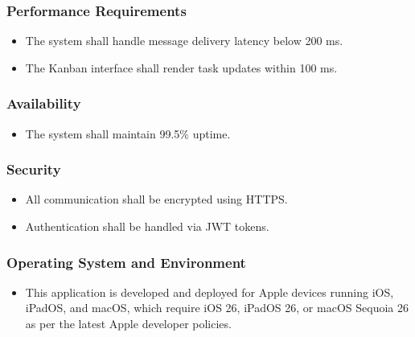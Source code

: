 \documentclass[11pt]{article}
\begin{document}
\subsubsection{Performance Requirements}
\begin{itemize}
  \item The system shall handle message delivery latency below 200 ms.
  \item The Kanban interface shall render task updates within 100 ms.
\end{itemize}

\subsubsection{Availability}
\begin{itemize}
  \item The system shall maintain 99.5\% uptime.
\end{itemize}

\subsubsection{Security}
\begin{itemize}
  \item All communication shall be encrypted using HTTPS.
  \item Authentication shall be handled via JWT tokens.
\end{itemize}

\subsubsection{Operating System and Environment}
\begin{itemize}
  \item This application is developed and deployed for Apple devices running iOS, iPadOS, and macOS, which require iOS 26, iPadOS 26, or macOS Sequoia 26 as per the latest Apple developer policies.
\end{itemize}

\end{document}
